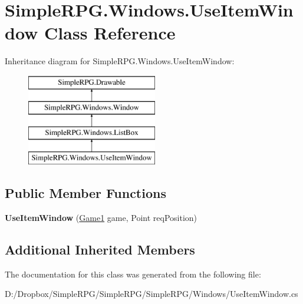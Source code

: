 \hypertarget{class_simple_r_p_g_1_1_windows_1_1_use_item_window}{\section{Simple\+R\+P\+G.\+Windows.\+Use\+Item\+Window Class Reference}
\label{class_simple_r_p_g_1_1_windows_1_1_use_item_window}
}
Inheritance diagram for Simple\+R\+P\+G.\+Windows.\+Use\+Item\+Window\+:\begin{figure}[H]
\begin{center}
\leavevmode
\includegraphics[height=4.000000cm]{class_simple_r_p_g_1_1_windows_1_1_use_item_window}
\end{center}
\end{figure}
\subsection*{Public Member Functions}
\begin{DoxyCompactItemize}
\item 
\hypertarget{class_simple_r_p_g_1_1_windows_1_1_use_item_window_a4eba542441bee99f975409f2d39ccfdd}{{\bfseries Use\+Item\+Window} (\hyperlink{class_simple_r_p_g_1_1_game1}{Game1} game, Point req\+Position)}\label{class_simple_r_p_g_1_1_windows_1_1_use_item_window_a4eba542441bee99f975409f2d39ccfdd}

\end{DoxyCompactItemize}
\subsection*{Additional Inherited Members}


The documentation for this class was generated from the following file\+:\begin{DoxyCompactItemize}
\item 
D\+:/\+Dropbox/\+Simple\+R\+P\+G/\+Simple\+R\+P\+G/\+Simple\+R\+P\+G/\+Windows/Use\+Item\+Window.\+cs\end{DoxyCompactItemize}
